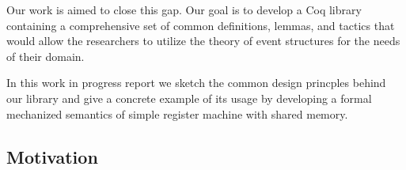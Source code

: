 Our work is aimed to close this gap. 
Our goal is to develop a Coq library containing 
a comprehensive set of common definitions, lemmas, 
and tactics that would allow the researchers 
to utilize the theory of event structures 
for the needs of their domain. 

In this work in progress report we sketch 
the common design princples behind our library
and give a concrete example of its usage  
by developing a formal mechanized semantics of simple 
register machine with shared memory. 

\subsection{Motivation}




